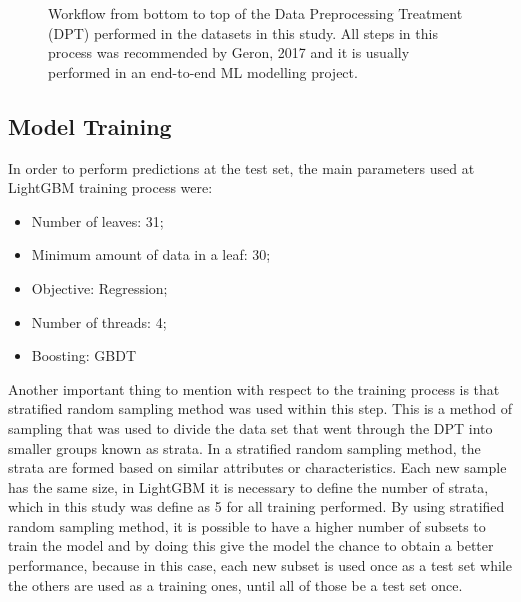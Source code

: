 \documentclass[letterpaper, 10 pt, conference]{ieeeconf}  %
\begin{document}
\begin{figure}[thpb]
\centering
{}
\caption{Workflow from bottom to top of the Data Preprocessing Treatment (DPT) performed in the datasets in this study. All steps in this process was recommended by Geron, 2017 \cite{Geron} and it is usually performed in an end-to-end ML modelling project.}
\label{workflow}
\end{figure}  
  

\subsection{Model Training}
In order to perform predictions at the test set, the main parameters used at LightGBM training process were:

\begin{itemize}
\item Number of leaves: 31;
\item Minimum amount of data in a leaf: 30;
\item Objective: Regression;
\item Number of threads: 4;
\item Boosting: GBDT
\end{itemize}

Another important thing to mention with respect to the training process is that stratified random sampling method was used within this step. This is a method of sampling that was used to divide the data set that went through the DPT into smaller groups known as strata. In a stratified random sampling method, the strata are formed based on similar attributes or characteristics. Each new sample has the same size, in LightGBM it is necessary to define the number of strata, which in this study was define as 5 for all training performed. By using stratified random sampling method, it is possible to have a higher number of subsets to train the model and by doing this give the model the chance to obtain a better performance, because in this case, each new subset is used once as a test set while the others are used as a training ones, until all of those be a test set once. 

\end{document}
